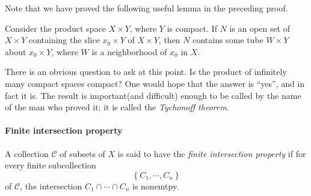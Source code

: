 \noindent Note that we have proved the following useful lemma in the preceding proof.

\begin{lemma}
  Consider the product space \( X \times Y \), where \( Y \) is compact.
  If \( N \) is an open set of \( X \times Y \) containing the slice \( x_0 \times Y \) of \( X \times Y \), then \( N \) contains some tube \( W \times Y \) about \( x_0 \times Y \), where \( W \) is a neighborhood of \( x_0 \) in \( X \).
\end{lemma}

There is an obvious question to ask at this point.
Is the product of infinitely many compact spaces compact?
One would hope that the answer is ``yes'', and in fact it is.
The result is important(and difficult) enough to be called by the name of the man who proved it;
it is called the \emph{Tychonoff theorem}.

\paragraph{Finite intersection property}
\begin{definition}
  A collection \( \mathcal{C} \) of subsets of \( X \) is said to have the \emph{finite intersection property} if for every finite subcollection
  \[
    \left\lbrace C_1, \cdots, C_n \right\rbrace
  \]
  of \( \mathcal{C} \), the intersection \( C_1 \cap \cdots \cap C_n \) is nonemtpy.
\end{definition}

